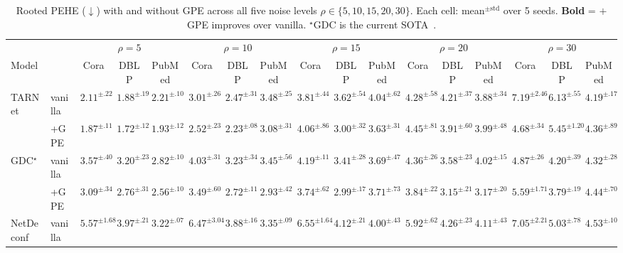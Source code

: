 \documentclass[sigconf,anonymous,review]{acmart}
\begin{document}
\begin{table}[t]
\caption{Rooted PEHE ($\downarrow$) with and without GPE across all five noise levels $\rho\in\{5,10,15,20,30\}$. Each cell: mean$^{\pm\text{std}}$ over 5 seeds. \textbf{Bold} = $+$GPE improves over vanilla. $^\star$GDC is the current SOTA~\cite{hu2025gdc}.}
\label{tab:main}
\centering
\footnotesize
\setlength{\tabcolsep}{2.0pt}
\begin{tabular}{@{}l l ccc ccc ccc ccc ccc@{}}
\toprule
& & \multicolumn{3}{c}{$\rho=5$} & \multicolumn{3}{c}{$\rho=10$} & \multicolumn{3}{c}{$\rho=15$} & \multicolumn{3}{c}{$\rho=20$} & \multicolumn{3}{c}{$\rho=30$} \\
\cmidrule(lr){3-5} \cmidrule(lr){6-8} \cmidrule(lr){9-11} \cmidrule(lr){12-14} \cmidrule(lr){15-17}
Model & & Cora & DBLP & PubMed & Cora & DBLP & PubMed & Cora & DBLP & PubMed & Cora & DBLP & PubMed & Cora & DBLP & PubMed \\
\midrule
\multirow{2}{*}{TARNet}   & vanilla & $2.11^{\pm.22}$ & $1.88^{\pm.19}$ & $2.21^{\pm.10}$ & $3.01^{\pm.26}$ & $2.47^{\pm.31}$ & $3.48^{\pm.25}$ & $3.81^{\pm.44}$ & $3.62^{\pm.54}$ & $4.04^{\pm.62}$ & $4.28^{\pm.58}$ & $4.21^{\pm.37}$ & $3.88^{\pm.34}$ & $7.19^{\pm2.46}$ & $6.13^{\pm.55}$ & $4.19^{\pm.17}$ \\
 & +GPE & $\mathbf{1.87}^{\pm.11}$ & $\mathbf{1.72}^{\pm.12}$ & $\mathbf{1.93}^{\pm.12}$ & $\mathbf{2.52}^{\pm.23}$ & $\mathbf{2.23}^{\pm.08}$ & $\mathbf{3.08}^{\pm.31}$ & $4.06^{\pm.86}$ & $\mathbf{3.00}^{\pm.32}$ & $\mathbf{3.63}^{\pm.31}$ & $4.45^{\pm.81}$ & $\mathbf{3.91}^{\pm.60}$ & $3.99^{\pm.48}$ & $\mathbf{4.68}^{\pm.34}$ & $\mathbf{5.45}^{\pm1.20}$ & $4.36^{\pm.89}$ \\
\midrule
\multirow{2}{*}{GDC$^\star$}  & vanilla & $3.57^{\pm.40}$ & $3.20^{\pm.23}$ & $2.82^{\pm.10}$ & $4.03^{\pm.31}$ & $3.23^{\pm.34}$ & $3.45^{\pm.56}$ & $4.19^{\pm.11}$ & $3.41^{\pm.28}$ & $3.69^{\pm.47}$ & $4.36^{\pm.26}$ & $3.58^{\pm.23}$ & $4.02^{\pm.15}$ & $4.87^{\pm.26}$ & $4.20^{\pm.39}$ & $4.32^{\pm.28}$ \\
 & +GPE & $\mathbf{3.09}^{\pm.34}$ & $\mathbf{2.76}^{\pm.31}$ & $\mathbf{2.56}^{\pm.10}$ & $\mathbf{3.49}^{\pm.60}$ & $\mathbf{2.72}^{\pm.11}$ & $\mathbf{2.93}^{\pm.42}$ & $\mathbf{3.74}^{\pm.62}$ & $\mathbf{2.99}^{\pm.17}$ & $3.71^{\pm.73}$ & $\mathbf{3.84}^{\pm.22}$ & $\mathbf{3.15}^{\pm.21}$ & $\mathbf{3.17}^{\pm.20}$ & $5.59^{\pm1.71}$ & $\mathbf{3.79}^{\pm.19}$ & $4.44^{\pm.70}$ \\
\midrule
\multirow{2}{*}{NetDeconf} & vanilla & $5.57^{\pm1.68}$ & $3.97^{\pm.21}$ & $3.22^{\pm.07}$ & $6.47^{\pm3.04}$ & $3.88^{\pm.16}$ & $3.35^{\pm.09}$ & $6.55^{\pm1.64}$ & $4.12^{\pm.21}$ & $4.00^{\pm.43}$ & $5.92^{\pm.62}$ & $4.26^{\pm.23}$ & $4.11^{\pm.43}$ & $7.05^{\pm2.21}$ & $5.03^{\pm.78}$ & $4.53^{\pm.10}$ \\

\end{tabular}
\end{table}
\end{document}
